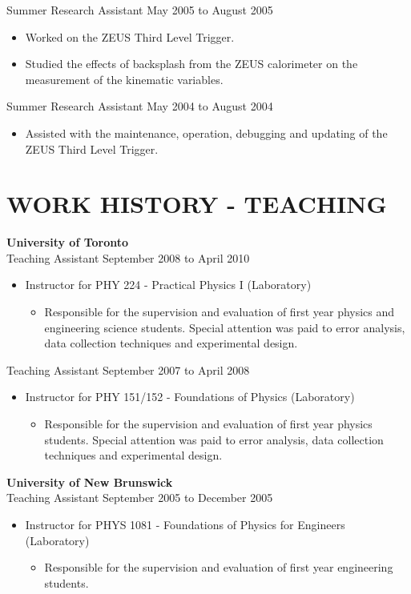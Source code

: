 \documentclass[margin]{res}
\begin{document}
\begin{resume}
\begin{itemize}
\end{itemize}
Summer Research Assistant \hfill May 2005 to August 2005\\
\begin{itemize}
  \item Worked on the ZEUS Third Level Trigger.
  \item Studied the effects of backsplash from the ZEUS calorimeter on the measurement of the kinematic variables.
\end{itemize}
Summer Research Assistant \hfill May 2004 to August 2004 \\
\begin{itemize}
\item Assisted with the maintenance, operation, debugging and updating of the ZEUS Third Level Trigger. 
\end{itemize}

\section{WORK HISTORY - TEACHING}
{\bf University of Toronto} \\
Teaching Assistant \hfill September 2008 to April 2010 
\begin{itemize}
\item Instructor for PHY 224 - Practical  Physics I (Laboratory)
  \begin{itemize}
    \item Responsible for the supervision and evaluation of first year physics and engineering science students.  Special attention was paid to error analysis, data collection techniques and experimental design.
  \end{itemize}
\end{itemize}
Teaching Assistant \hfill September 2007 to April 2008 
\begin{itemize}
\item Instructor for PHY 151/152 - Foundations of Physics  (Laboratory)
  \begin{itemize}
    \item Responsible for the supervision and evaluation of first year physics students.  Special attention was paid to error analysis, data collection techniques and experimental design.
  \end{itemize}
\end{itemize}
{\bf University of New Brunswick} \\
Teaching Assistant \hfill September 2005 to December 2005 
\begin{itemize}
\item Instructor for PHYS 1081 - Foundations of Physics for Engineers (Laboratory)
  \begin{itemize}
    \item Responsible for the supervision and evaluation of first year engineering students.
  \end{itemize}
\end{itemize}


\end{resume}
\end{document}
